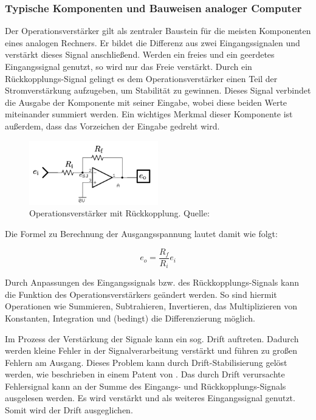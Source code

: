 \subsubsection{Typische Komponenten und Bauweisen analoger Computer}
\label{chap:Typische Komponenten und Bauweisen analoger Computer}

Der Operationsverstärker gilt als zentraler Baustein für die meisten Komponenten eines analogen Rechners. Er bildet die Differenz aus zwei Eingangssignalen und verstärkt dieses Signal anschließend. Werden ein freies und ein geerdetes Eingangssignal genutzt, so wird nur das Freie verstärkt. Durch ein Rückkopplungs-Signal gelingt es dem Operationsverstärker einen Teil der Stromverstärkung aufzugeben, um Stabilität zu gewinnen. Dieses Signal verbindet die Ausgabe der Komponente mit seiner Eingabe, wobei diese beiden Werte miteinander summiert werden. Ein wichtiges Merkmal dieser Komponente ist außerdem, dass das Vorzeichen der Eingabe gedreht wird. \cite[vgl. S. 73 f.]{Ulmann2022}

\begin{figure}[h]
  \includegraphics[width=0.5\textwidth]{abbildungen/opamp_mit_rueckkopplung.png}
  \caption{Operationsverstärker mit Rückkopplung. Quelle: \cite[S. 76]{Ulmann2022}}
  \label{fig:Operationsverstärker mit Rückkopplung}
\end{figure}

Die Formel zu Berechnung der Ausgangsspannung lautet damit wie folgt:

\[e_o=\frac{R_f}{R_i}e_i\]

Durch Anpassungen des Eingangssignals bzw. des Rückkopplungs-Signals kann die Funktion des Operationsverstärkers geändert werden. So sind hiermit Operationen wie Summieren, Subtrahieren, Invertieren, das Multiplizieren von Konstanten, Integration und (bedingt) die Differenzierung möglich.

Im Prozess der Verstärkung der Signale kann ein sog. Drift auftreten. Dadurch werden kleine Fehler in der Signalverarbeitung verstärkt und führen zu großen Fehlern am Ausgang. Dieses Problem kann durch Drift-Stabilisierung gelöst werden, wie beschrieben in einem Patent von \cite{Goldberg1954}. Das durch Drift verursachte Fehlersignal kann an der Summe des Eingangs- und Rückkopplungs-Signals ausgelesen werden. Es wird verstärkt und als weiteres Eingangssignal genutzt. Somit wird der Drift ausgeglichen. \cite[vgl. S. 80]{Ulmann2022}

